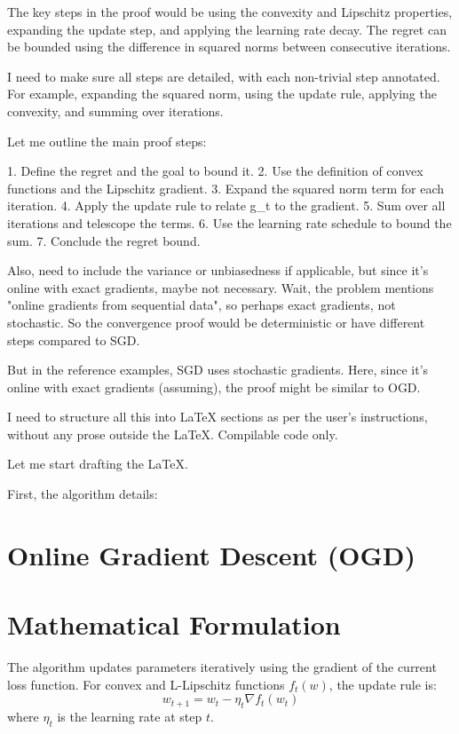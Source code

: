 \documentclass{article}
\begin{document}
The key steps in the proof would be using the convexity and Lipschitz properties, expanding the update step, and applying the learning rate decay. The regret can be bounded using the difference in squared norms between consecutive iterations.

I need to make sure all steps are detailed, with each non-trivial step annotated. For example, expanding the squared norm, using the update rule, applying the convexity, and summing over iterations.

Let me outline the main proof steps:

1. Define the regret and the goal to bound it.
2. Use the definition of convex functions and the Lipschitz gradient.
3. Expand the squared norm term for each iteration.
4. Apply the update rule to relate g_t to the gradient.
5. Sum over all iterations and telescope the terms.
6. Use the learning rate schedule to bound the sum.
7. Conclude the regret bound.

Also, need to include the variance or unbiasedness if applicable, but since it's online with exact gradients, maybe not necessary. Wait, the problem mentions "online gradients from sequential data", so perhaps exact gradients, not stochastic. So the convergence proof would be deterministic or have different steps compared to SGD.

But in the reference examples, SGD uses stochastic gradients. Here, since it's online with exact gradients (assuming), the proof might be similar to OGD.

I need to structure all this into LaTeX sections as per the user's instructions, without any prose outside the LaTeX. Compilable code only.

Let me start drafting the LaTeX.

First, the algorithm details:

\section*{Online Gradient Descent (OGD)}
\section*{Mathematical Formulation}
The algorithm updates parameters iteratively using the gradient of the current loss function. For convex and L-Lipschitz functions \( f_t(w) \), the update rule is:
\[ w_{t+1} = w_t - \eta_t \nabla f_t(w_t) \]
where \( \eta_t \) is the learning rate at step \( t \).
\end{document}
